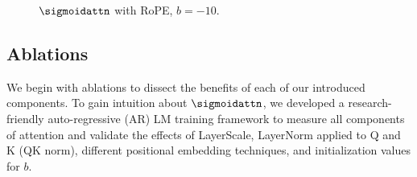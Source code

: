 \begin{figure}[htbp]
\begin{minipage}{0.48\textwidth}
        \captionsetup{justification=centering}
        \caption{$\sigmoidattn$ with RoPE, $b=-10$.}
        \label{fig:rope_vs_rope_b-10}
    \end{minipage}  
    \vspace{-0.4cm}
\end{figure}

\subsection{Ablations}
\label{sec:ablations}
We begin with ablations to dissect the benefits of each of our introduced components. To gain intuition about $\sigmoidattn$, we developed a research-friendly auto-regressive (AR) LM training framework to measure all components of attention and validate the effects of LayerScale, LayerNorm applied to Q and K (QK norm), different positional embedding techniques, and initialization values for $b$.

